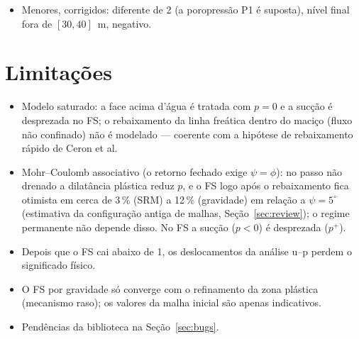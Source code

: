 \documentclass[11pt,a4paper]{article}
\begin{document}
\begin{itemize}
  ainda na configuração anterior à correção das malhas (u--p em , estabilidade em
  , ciclo 0; só a variação relativa é indicativa): o FS logo após o rebaixamento cai de
  1,137 ($\psi=30^\circ$) para 1,115 ($15^\circ$) e 1,106 ($5^\circ$) por SRM, e de 1,540 para 1,370 por
  gravidade. O FS desse instante é, portanto,
  otimista em alguns por cento; o regime permanente não depende de $\psi$. O retorno fechado do artigo
  só admite $\psi=\phi$, e o modelo antigo com $\psi=0$ falha no ápice (gradiente nulo).
\item Menores, corrigidos:  diferente de 2 (a poropressão P1 é suposta), nível final fora de
  $[30,40]$~m,  negativo.
\end{itemize}

\section{Limitações}
\begin{itemize}
\item Modelo saturado: a face acima d'água é tratada com $p=0$ e a sucção é desprezada no FS; o
  rebaixamento da linha freática dentro do maciço (fluxo não confinado) não é modelado --- coerente
  com a hipótese de rebaixamento rápido de Ceron et al.
\item Mohr--Coulomb associativo (o retorno fechado exige $\psi=\phi$): no passo não drenado a dilatância
  plástica reduz $p$, e o FS logo após o rebaixamento fica otimista em cerca de 3\,\% (SRM) a 12\,\%
  (gravidade) em relação a $\psi=5^\circ$ (estimativa da configuração antiga de malhas,
  Seção~\ref{sec:review}); o regime permanente não depende
  disso. No FS a sucção ($p<0$) é desprezada ($p^+$).
\item Depois que o FS cai abaixo de 1, os deslocamentos da análise u--p perdem o significado físico.
\item O FS por gravidade só converge com o refinamento da zona plástica (mecanismo raso); os valores
  da malha inicial são apenas indicativos.
\item Pendências da biblioteca na Seção~\ref{sec:bugs}.
\end{itemize}

\end{document}
